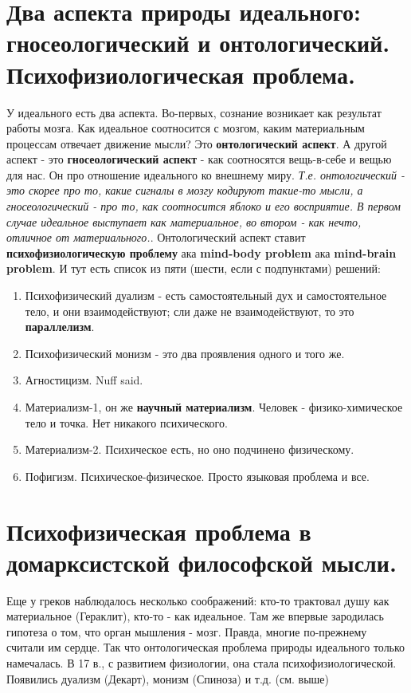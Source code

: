 \section{ Два аспекта природы идеального: гносеологический и онтологический. Психофизиологическая проблема.}
У идеального есть два аспекта. Во-первых, сознание возникает как результат работы мозга. Как идеальное соотносится с мозгом, каким материальным процессам отвечает движение мысли? Это \textbf{онтологический аспект}. А другой аспект - это \textbf{гносеологический аспект} - как соотносятся вещь-в-себе и вещью для нас. Он про отношение идеального ко внешнему миру. \textit{Т.е. онтологический - это скорее про то, какие сигналы в мозгу кодируют такие-то мысли, а гносеологический - про то, как соотносится яблоко и его восприятие. В первом случае идеальное выступает как материальное, во втором - как нечто, отличное от материального.}. Онтологический аспект ставит \textbf{психофизиологическую проблему} ака \textbf{mind-body problem} ака \textbf{mind-brain problem}. И тут есть список из пяти (шести, если с подпунктами) решений:
\begin{enumerate}
\item Психофизический дуализм - есть самостоятельный дух и самостоятельное тело, и они взаимодействуют; сли даже не взаимодействуют, то это \textbf{параллелизм}.
\item Психофизический монизм - это два проявления одного и того же.
\item Агностицизм. Nuff said.
\item Материализм-1, он же \textbf{научный материализм}. Человек - физико-химическое тело и точка. Нет никакого психического.
\item Материализм-2. Психическое есть, но оно подчинено физическому.
\item Пофигизм. Психическое-физическое. Просто языковая проблема и все.
\end{enumerate}

\section{ Психофизическая проблема в домарксистской философской мысли.}
Еще у греков наблюдалось несколько соображений: кто-то трактовал душу как материальное (Гераклит), кто-то - как идеальное. Там же впервые зародилась гипотеза о том, что орган мышления - мозг. Правда, многие по-прежнему считали им сердце. Так что онтологическая проблема природы идеального только намечалась. В 17 в., с развитием физиологии, она стала психофизиологической. Появились дуализм (Декарт), монизм (Спиноза) и т.д. (см. выше)

